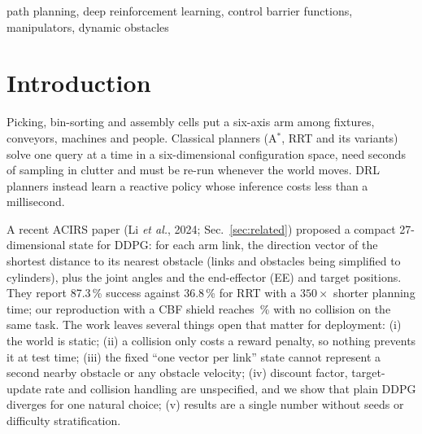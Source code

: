 \documentclass[conference]{IEEEtran}
\begin{document}
\begin{IEEEkeywords}
path planning, deep reinforcement learning, control barrier functions, manipulators, dynamic obstacles
\end{IEEEkeywords}

\section{Introduction}
Picking, bin-sorting and assembly cells put a six-axis arm among fixtures, conveyors, machines and people. Classical planners (A$^*$, RRT and its variants) solve one query at a time in a six-dimensional configuration space, need seconds of sampling in clutter and must be re-run whenever the world moves. DRL planners instead learn a reactive policy whose inference costs less than a millisecond.

A recent ACIRS paper (Li \emph{et al.}, 2024; Sec.~\ref{sec:related}) proposed a compact 27-dimensional state for DDPG: for each arm link, the direction vector of the shortest distance to its nearest obstacle (links and obstacles being simplified to cylinders), plus the joint angles and the end-effector (EE) and target positions. They report 87.3\,\% success against 36.8\,\% for RRT with a $350\times$ shorter planning time; our reproduction with a CBF shield reaches \Sstaticshieldevalcmk{}\,\% with no collision on the same task. The work leaves several things open that matter for deployment: (i) the world is static; (ii) a collision only costs a reward penalty, so nothing prevents it at test time; (iii) the fixed ``one vector per link'' state cannot represent a second nearby obstacle or any obstacle velocity; (iv) discount factor, target-update rate and collision handling are unspecified, and we show that plain DDPG diverges for one natural choice; (v) results are a single number without seeds or difficulty stratification.
\end{document}
